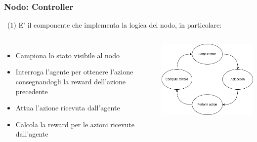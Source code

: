 \documentclass[compress]{beamer}
\begin{document}
\subsubsection*{Nodo: Controller}
\begin{frame}{\subsubsecname\ (1)}
E' il componente che implementa la logica del nodo, in particolare:
\vspace{0.5cm}
    \begin{columns}
            \begin{minipage}[b]{1\textwidth}
                \begin{itemize}
                    \item Campiona lo stato visibile al nodo
                    \item Interroga l'agente per ottenere l'azione consegnandogli la reward dell'azione precedente
                    \item Attua l'azione ricevuta dall'agente
                    \item Calcola la reward per le azioni ricevute dall'agente
                \end{itemize}
            \end{minipage}
            \begin{minipage}{.9\textwidth}
                \begin{adjustbox}{margin=0.5cm 0cm 0.1cm 0.2cm, center} %
                    \includegraphics[width=1\textwidth]{figs/control_loop.png}
                \end{adjustbox}
            \end{minipage}
    \end{columns}
\end{frame}
\end{document}
